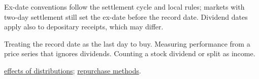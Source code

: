 \begin{qfdefinition}
 Ex-date conventions follow the settlement cycle and local rules; markets with two-day settlement still set the ex-date before the record date. Dividend dates apply also to depositary receipts, which may differ.

 Treating the record date as the last day to buy. Measuring performance from a price series that ignores dividends. Counting a stock dividend or split as income.

 \hyperref[meth:distribution-effects]{effects of distributions}; \hyperref[meth:payout-policy-comparison]{repurchase methods}.

\end{qfdefinition}
